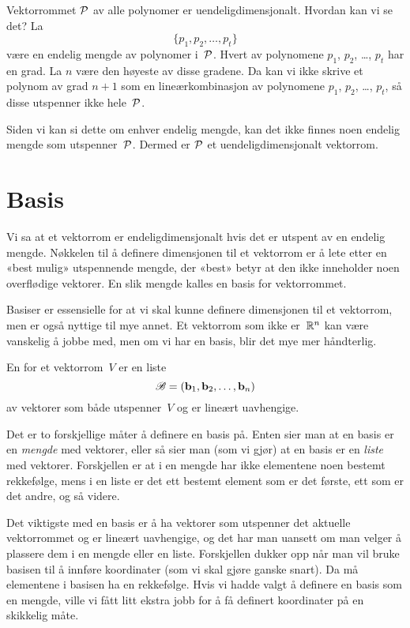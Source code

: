\begin{ex}
Vektorrommet $\P$ av alle polynomer er uendeligdimensjonalt.  Hvordan
kan vi se det?  La
\[
\{ p_1, p_2, \ldots, p_t \}
\]
være en endelig mengde av polynomer i~$\P$.  Hvert av polynomene
$p_1$, $p_2$, \ldots, $p_t$ har en grad.  La $n$ være den høyeste av
disse gradene.  Da kan vi ikke skrive et polynom av grad $n+1$ som en
lineærkombinasjon av polynomene $p_1$, $p_2$, \ldots, $p_t$, så disse
utspenner ikke hele~$\P$.

Siden vi kan si dette om enhver endelig mengde, kan det ikke finnes
noen endelig mengde som utspenner~$\P$.  Dermed er $\P$ et
uendeligdimensjonalt vektorrom.
\end{ex}


\section*{Basis}

Vi sa at et vektorrom er endeligdimensjonalt hvis det er utspent av en
endelig mengde.  Nøkkelen til å definere dimensjonen til et vektorrom
er å lete etter en «best mulig» utspennende mengde, der «best» betyr
at den ikke inneholder noen overflødige vektorer.  En slik mengde
kalles en basis for vektorrommet.

Basiser er essensielle for at vi skal kunne definere dimensjonen til
et vektorrom, men er også nyttige til mye annet.  Et vektorrom som
ikke er~$\R^n$ kan være vanskelig å jobbe med, men om vi har en basis,
blir det mye mer håndterlig.

\begin{defn}
En  for et vektorrom~$V$ er en liste
\[
\B = (\b_1, \b_2, \ldots, \b_n)
\]
av vektorer som både utspenner~$V$ og er lineært uavhengige.
\end{defn}

\begin{merk}
Det er to forskjellige måter å definere en basis på.  Enten sier man
at en basis er en \emph{mengde} med vektorer, eller så sier man (som
vi gjør) at en basis er en \emph{liste} med vektorer.  Forskjellen er
at i en mengde har ikke elementene noen bestemt rekkefølge, mens i en
liste er det ett bestemt element som er det første, ett som er det
andre, og så videre.

Det viktigste med en basis er å ha vektorer som utspenner det aktuelle
vektorrommet og er lineært uavhengige, og det har man uansett om man
velger å plassere dem i en mengde eller en liste.  Forskjellen dukker
opp når man vil bruke basisen til å innføre koordinater (som vi skal
gjøre ganske snart).  Da må elementene i basisen ha en rekkefølge.
Hvis vi hadde valgt å definere en basis som en mengde, ville vi fått
litt ekstra jobb for å få definert koordinater på en skikkelig måte.
\end{merk}

